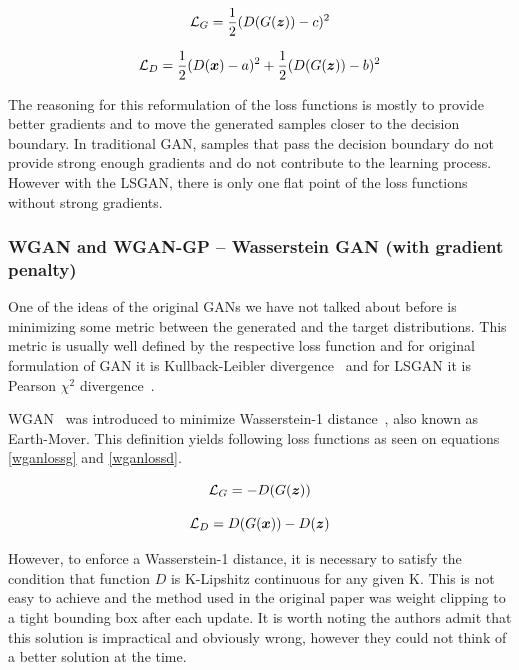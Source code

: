 \begin{equation}
\mathcal{L}_G = \frac{1}{2}(D(G(\bm{z})) - c)^2
\label{lsganlossg}
\end{equation}

\begin{equation}
\mathcal{L}_D = \frac{1}{2}(D(\bm{x}) - a)^2 + \frac{1}{2}(D(G(\bm{z})) - b)^2
\label{lsganlossd}
\end{equation}

The reasoning for this reformulation of the loss functions is mostly to provide better gradients and to move the generated samples closer to the decision boundary. In traditional GAN, samples that pass the decision boundary do not provide strong enough gradients and do not contribute to the learning process. However with the LSGAN, there is only one flat point of the loss functions without strong gradients.

\subsubsection{WGAN and WGAN-GP -- Wasserstein GAN (with gradient penalty)}

One of the ideas of the original GANs we have not talked about before is minimizing some metric between the generated and the target distributions. This metric is usually well defined by the respective loss function and for original formulation of GAN it is Kullback-Leibler divergence~\cite{kullback} and for LSGAN it is Pearson $\chi^2$ divergence~\cite{pearson}.

WGAN~\cite{wgan} was introduced to minimize Wasserstein-1 distance~\cite{wasser}, also known as Earth-Mover. This definition yields following loss functions as seen on equations \ref{wganlossg} and \ref{wganlossd}.

\begin{equation}
\mathcal{L}_G = -D(G(\bm{z}))
\label{wganlossg}
\end{equation}

\begin{equation}
\mathcal{L}_D = D(G(\bm{x})) - D(\bm{z})
\label{wganlossd}
\end{equation}

However, to enforce a Wasserstein-1 distance, it is necessary to satisfy the condition that function $D$ is K-Lipshitz continuous for any given K. This is not easy to achieve and the method used in the original paper was weight clipping to a tight bounding box after each update. It is worth noting the authors admit that this solution is impractical and obviously wrong, however they could not think of a better solution at the time.

